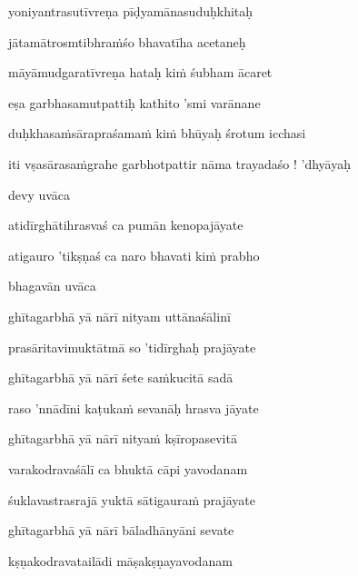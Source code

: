 yoniyantrasutīvreṇa pīḍyamānasuduḥkhitaḥ\thinspace{\dandab} \dontdisplaylinenum

jātamātrosmtibhra\.mśo bhavatīha acetaneḥ \veg\dontdisplaylinenum

māyāmudgaratīvreṇa hataḥ ki\.m śubham ācaret\thinspace{\dandab} \dontdisplaylinenum

eṣa garbhasamutpattiḥ kathito 'smi varānane \danda\dontdisplaylinenum

duḥkhasa\.msārapraśama\.m ki\.m bhūyaḥ śrotum icchasi \veg\dontdisplaylinenum


\jump
\begin{center}
\ketdanda iti vṣasārasa\.mgrahe garbhotpattir nāma trayadaśo ! 'dhyāyaḥ\ketdanda
\end{center}
\dontdisplaylinenum\vers 
\bekveg\szamveg\vfill\phpspagebreak\szam\bek{}
\thispagestyle{empty}


\vers


\jump\jump 
devy uvāca~{\dandab}\dontdisplaylinenum 

atidīrghātihrasvaś ca pumān kenopajāyate\thinspace{\danda} \dontdisplaylinenum

atigauro 'tikṣṇaś ca naro bhavati ki\.m prabho \veg\dontdisplaylinenum

bhagavān uvāca~{\dandab}\dontdisplaylinenum 

ghītagarbhā yā nārī nityam uttānaśālinī\thinspace{\danda} \dontdisplaylinenum

prasāritavimuktātmā so 'tidīrghaḥ prajāyate \veg\dontdisplaylinenum

ghītagarbhā yā nārī śete sa\.mkucitā sadā\thinspace{\dandab} \dontdisplaylinenum

raso 'nnādīni kaṭuka\.m sevanāḥ hrasva jāyate \veg\dontdisplaylinenum

ghītagarbhā yā nārī nitya\.m kṣīropasevitā\thinspace{\dandab} \dontdisplaylinenum

varakodravaśālī ca bhuktā cāpi yavodanam \veg\dontdisplaylinenum

śuklavastrasrajā yuktā sātigaura\.m prajāyate\thinspace{\dandab} \dontdisplaylinenum

ghītagarbhā yā nārī bāladhānyāni sevate \veg\dontdisplaylinenum

kṣṇakodravatailādi māṣakṣṇayavodanam\thinspace{\dandab} \dontdisplaylinenum

